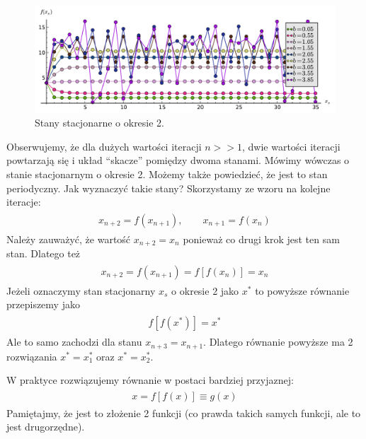 \documentclass[a4paper,12pt,polish]{sphinxmanual}
\begin{document}
\begin{figure}[htbp]
\centering
\capstart

\includegraphics{sage_chI031_04.pdf}
\caption{Stany stacjonarne o okresie 2.}\end{figure}

Obserwujemy, że dla dużych wartości iteracji $n>>1$, dwie wartości iteracji powtarzają się i układ ``skacze'' pomiędzy dwoma stanami. Mówimy wówczas o stanie stacjonarnym o okresie 2. Możemy także powiedzieć, że jest to stan periodyczny. Jak wyznaczyć takie stany?  Skorzystamy ze wzoru na kolejne iteracje:
\label{ch1/chI031:equation-eqn26}\begin{gather}
\begin{split}x_{n+2} = f(x_{n+1}), \qquad x_{n+1} = f(x_{n})\end{split}\label{ch1/chI031-eqn26}
\end{gather}
Należy zauważyć, że wartość $x_{n+2} = x_n$ ponieważ co drugi krok jest ten sam stan. Dlatego też
\label{ch1/chI031:equation-eqn27}\begin{gather}
\begin{split}x_{n+2} = f(x_{n+1}) = f[f(x_{n})] = x_n\end{split}\label{ch1/chI031-eqn27}
\end{gather}
Jeżeli oznaczymy stan stacjonarny $x_s$ o okresie 2 jako $x^*$ to powyższe równanie przepiszemy jako
\label{ch1/chI031:equation-eqn28}\begin{gather}
\begin{split}f[f(x^*)] = x^*\end{split}\label{ch1/chI031-eqn28}
\end{gather}
Ale to samo zachodzi dla stanu $x_{n+3} = x_{n+1}$. Dlatego równanie powyższe ma 2 rozwiązania $x^* = x^*_1$  oraz  $x^* = x^*_2$.

W praktyce rozwiązujemy równanie w postaci bardziej przyjaznej:
\label{ch1/chI031:equation-eqn29}\begin{gather}
\begin{split}x = f[f(x)] \equiv g(x)\end{split}\label{ch1/chI031-eqn29}
\end{gather}
Pamiętajmy, że jest to złożenie 2 funkcji (co prawda takich samych funkcji, ale to jest drugorzędne).
\end{document}
